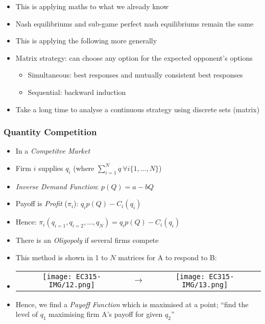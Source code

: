 \documentclass[11pt, english]{article}
\begin{document}
	\begin{itemize}
	\setlength\itemsep{0cm}
		\item This is applying maths to what we already know
		\item Nash equilibriums and sub-game perfect nash equilibriums remain the same
		\item This is applying the following more generally  
		\item Matrix strategy: can choose any option for the expected opponent's options
		\begin{itemize}
			\item Simultaneous: best responses and mutually consistent best responses
			\item Sequential: backward induction 
		\end{itemize}
		\item Take a long time to analyse a continuous strategy using discrete sets (matrix)
	\end{itemize}

		\subsubsection{Quantity Competition}

	\begin{itemize}
	\setlength\itemsep{0cm}
		\item In a \textit{Competitve Market}
		\item Firm $i$ supplies $q_i$ (where $\sum_{i=1}^Nq\ \forall i\{1,...,N\}$)
		\item \textit{Inverse Demand Function}: $p(Q)=a-bQ$
		\item Payoff is \textit{Profit} ($\pi_i$): $q_ip(Q)-C_i(q_i)$
		\item Hence: $\pi_i(q_{i=1},q_{i=2},...,q_N)=q_ip(Q)-C_i(q_i)$
		\item There is an \textit{Oligopoly} if several firms compete
		\item This method is shown in 1 to $N$ matrices for A to respond to B:
		\item 
			\begin{center}
			\begin{tabular}{ccc}
				\texttt{[image: EC315-IMG/12.png]} & $\longrightarrow$ & \texttt{[image: EC315-IMG/13.png]}\\
			\end{tabular}
			\end{center}
		\item Hence, we find a \textit{Payoff Function} which is maximised at a point; ``find the level of $q_1$ maximising firm A's payoff for given $q_2$''
	\end{itemize}
\end{document}
